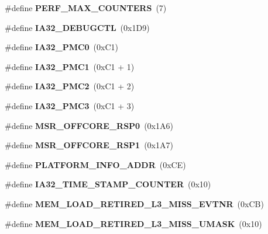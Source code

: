 \begin{DoxyCompactItemize}
\item 
\#define {\bfseries P\+E\+R\+F\+\_\+\+M\+A\+X\+\_\+\+C\+O\+U\+N\+T\+E\+R\+S}~(7)\label{types_8h_aed6a86fa515f9e1e01b1809c1d9ecb29}

\item 
\#define {\bfseries I\+A32\+\_\+\+D\+E\+B\+U\+G\+C\+T\+L}~(0x1\+D9)\label{types_8h_a6e3807d506c237c1e48f8a1c86568711}

\item 
\#define {\bfseries I\+A32\+\_\+\+P\+M\+C0}~(0x\+C1)\label{types_8h_a4554738d7da6a73d954483b208f81db3}

\item 
\#define {\bfseries I\+A32\+\_\+\+P\+M\+C1}~(0x\+C1 + 1)\label{types_8h_a8fa283364a2d1104f70d904270883cb2}

\item 
\#define {\bfseries I\+A32\+\_\+\+P\+M\+C2}~(0x\+C1 + 2)\label{types_8h_afe3565c403a07374f8d610cdf541baee}

\item 
\#define {\bfseries I\+A32\+\_\+\+P\+M\+C3}~(0x\+C1 + 3)\label{types_8h_a5566a7b0fe387bce0c26c686b10461d2}

\item 
\#define {\bfseries M\+S\+R\+\_\+\+O\+F\+F\+C\+O\+R\+E\+\_\+\+R\+S\+P0}~(0x1\+A6)\label{types_8h_a215d0676fd6bdc55c65ea6116919da53}

\item 
\#define {\bfseries M\+S\+R\+\_\+\+O\+F\+F\+C\+O\+R\+E\+\_\+\+R\+S\+P1}~(0x1\+A7)\label{types_8h_a78dc77e6b5f300a28990557043f946e2}

\item 
\#define {\bfseries P\+L\+A\+T\+F\+O\+R\+M\+\_\+\+I\+N\+F\+O\+\_\+\+A\+D\+D\+R}~(0x\+C\+E)\label{types_8h_a36cfb7e155c237aea26a1a61a08531b4}

\item 
\#define {\bfseries I\+A32\+\_\+\+T\+I\+M\+E\+\_\+\+S\+T\+A\+M\+P\+\_\+\+C\+O\+U\+N\+T\+E\+R}~(0x10)\label{types_8h_a2f40dbbbfee7082937c1387cf2c34d64}

\item 
\#define {\bfseries M\+E\+M\+\_\+\+L\+O\+A\+D\+\_\+\+R\+E\+T\+I\+R\+E\+D\+\_\+\+L3\+\_\+\+M\+I\+S\+S\+\_\+\+E\+V\+T\+N\+R}~(0x\+C\+B)\label{types_8h_a11151e507895f0b9fbf12448944361d1}

\item 
\#define {\bfseries M\+E\+M\+\_\+\+L\+O\+A\+D\+\_\+\+R\+E\+T\+I\+R\+E\+D\+\_\+\+L3\+\_\+\+M\+I\+S\+S\+\_\+\+U\+M\+A\+S\+K}~(0x10)\label{types_8h_a97de88538de409f371031bd4070e8359}


\end{DoxyCompactItemize}
